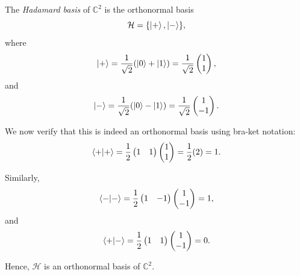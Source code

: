 \begin{definition}
The \emph{Hadamard basis} of $\mathbb{C}^2$ is the orthonormal basis
\[
\mathcal{H} = \{\ket{+}, \ket{-}\},
\]
where
\[
\ket{+}
=
\frac{1}{\sqrt{2}}(\ket{0}+\ket{1})
=
\frac{1}{\sqrt{2}}
\begin{pmatrix}
1\\
1
\end{pmatrix},
\]
and
\[
\ket{-}
=
\frac{1}{\sqrt{2}}(\ket{0}-\ket{1})
=
\frac{1}{\sqrt{2}}
\begin{pmatrix}
1\\
-1
\end{pmatrix}.
\]
\end{definition}

We now verify that this is indeed an orthonormal basis using bra-ket notation:
\[
\braket{+}
=
\frac{1}{2}
\begin{pmatrix}
1 & 1
\end{pmatrix}
\begin{pmatrix}
1\\
1
\end{pmatrix}
=
\frac{1}{2}(2)
=
1.
\]

Similarly,
\[
\braket{-}
=
\frac{1}{2}
\begin{pmatrix}
1 & -1
\end{pmatrix}
\begin{pmatrix}
1\\
-1
\end{pmatrix}
=
1,
\]
and
\[
\braket{+}{-}
=
\frac{1}{2}
\begin{pmatrix}
1 & 1
\end{pmatrix}
\begin{pmatrix}
1\\
-1
\end{pmatrix}
=
0.
\]

Hence, $\mathcal{H}$ is an orthonormal basis of $\mathbb{C}^2$.